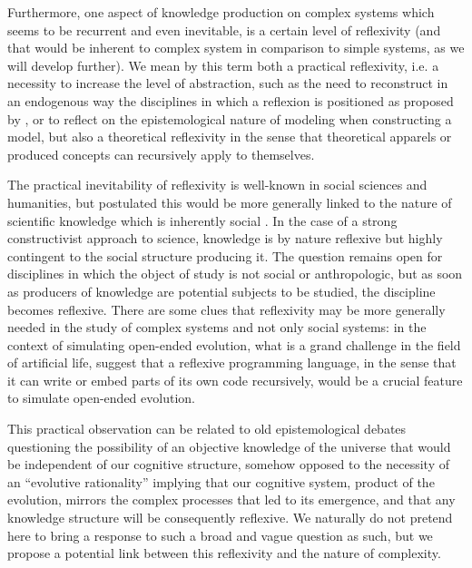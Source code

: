 Furthermore, one aspect of knowledge production on complex systems which seems to be recurrent and even inevitable, is a certain level of reflexivity (and that would be inherent to complex system in comparison to simple systems, as we will develop further). We mean by this term both a practical reflexivity, i.e. a necessity to increase the level of abstraction, such as the need to reconstruct in an endogenous way the disciplines in which a reflexion is positioned as proposed by \cite{2017arXiv171200805R}, or to reflect on the epistemological nature of modeling when constructing a model, but also a theoretical reflexivity in the sense that theoretical apparels or produced concepts can recursively apply to themselves.

The practical inevitability of reflexivity is well-known in social sciences and humanities, but \cite{bourdieu2004science} postulated this would be more generally linked to the nature of scientific knowledge which is inherently social \cite{maton2003reflexivity}. In the case of a strong constructivist approach to science, knowledge is by nature reflexive but highly contingent to the social structure producing it. The question remains open for disciplines in which the object of study is not social or anthropologic, but as soon as producers of knowledge are potential subjects to be studied, the discipline becomes reflexive. There are some clues that reflexivity may be more generally needed in the study of complex systems and not only social systems: in the context of simulating open-ended evolution, what is a grand challenge in the field of artificial life, \cite{banzhaf2016defining} suggest that a reflexive programming language, in the sense that it can write or embed parts of its own code recursively, would be a crucial feature to simulate open-ended evolution.


This practical observation can be related to old epistemological debates questioning the possibility of an objective knowledge of the universe that would be independent of our cognitive structure, somehow opposed to the necessity of an ``evolutive rationality'' implying that our cognitive system, product of the evolution, mirrors the complex processes that led to its emergence, and that any knowledge structure will be consequently reflexive. We naturally do not pretend here to bring a response to such a broad and vague question as such, but we propose a potential link between this reflexivity and the nature of complexity. 







